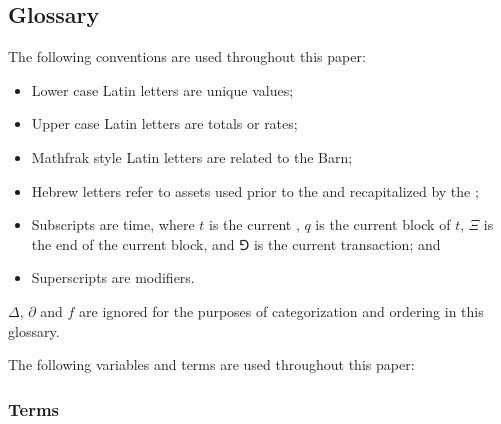 \documentclass[class=article, crop=false]{standalone}
\begin{document}

\subsection{Glossary}

The following conventions are used throughout this paper:

\begin{itemize}
    \item Lower case Latin letters are unique values;
    \item Upper case Latin letters are totals or rates;
    \item Mathfrak style Latin letters are related to the Barn; 
    \item Hebrew letters refer to assets used prior to the  and recapitalized by the ;
    \item Subscripts are time, where $t$ is the current , $q$ is the current block of $t$, \hypertarget{ht1}{$\Xi$} is the end of the current block, and $\Game$ is the current transaction; and
    \item Superscripts are modifiers.
\end{itemize}

$\Delta$, $\partial$ and $f$ are ignored for the purposes of categorization and ordering in this glossary. 

The following variables and terms are used throughout this paper:

\subsubsection{Terms}
\end{document}

